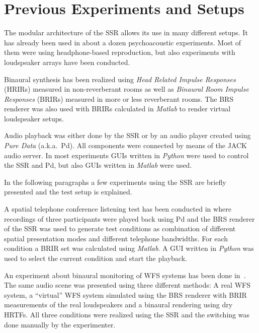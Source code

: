 \documentclass[a4paper]{article}
\begin{document}
\section{Previous Experiments and Setups}

The modular architecture of the SSR allows its use in many different setups.
It has already been used in about a dozen psychoacoustic experiments.
Most of them were using headphone-based reproduction, but also experiments with
loudspeaker arrays have been conducted.

Binaural synthesis has been realized using \emph{Head Related Impulse Responses}
(HRIRs) measured in non-reverberant rooms as well as \emph{Binaural Room
Impulse Responses} (BRIRs) measured in more or less reverberant rooms.
The BRS renderer was also used with BRIRs calculated in \emph{Matlab} to render
virtual loudspeaker setups.

Audio playback was either done by the SSR or by an audio player created using \emph{Pure Data} (a.k.a.\ Pd). 
All components were connected by means of the JACK audio server.
In most experiments GUIs written in \emph{Python} were used to control the
SSR and Pd, but also GUIs written in \emph{Matlab} were used.



In the following paragraphs a few experiments using the SSR are briefly
presented and the test setup is explained.

A spatial telephone conference listening test has been conducted in
\cite{raake2010:listening} where recordings of three participants were played
back using Pd and the BRS renderer of the SSR was used to generate test
conditions as combination of different spatial presentation modes and different
telephone bandwidths. For each condition a BRIR set was calculated using
\emph{Matlab}. A GUI written in \emph{Python} was used to select the current
condition and start the playback.

An experiment about binaural monitoring of WFS systems has been done
in~\cite{Geier09:DAGA}. The same audio scene was presented using three different
methods: A real WFS system, a ``virtual'' WFS system simulated using the BRS
renderer with BRIR measurements of the real loudspeakers and a binaural rendering
using dry HRTFs. All three conditions were realized using the SSR and the
switching was done manually by the experimenter.
\end{document}
